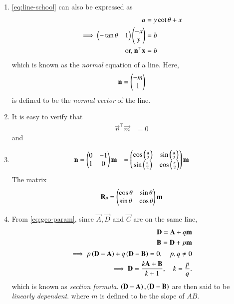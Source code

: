 \begin{enumerate}[label=\thesection.\arabic*.,ref=\thesection.\theenumi]
\item 			\eqref{eq:line-school} can also be expressed as
\begin{align}
	a &= y \cot \theta + x
	\\
\implies 	\begin{pmatrix}-\tan \theta & 1\end{pmatrix}\begin{pmatrix}-x \\ y\end{pmatrix} &= b
	\\
	 \text{or, }\mathbf{n}^{\top}\mathbf{x} &= b
\label{eq:geo-normal}
\end{align}
		which is known as the {\em normal} equation of a line.
		Here, 
\begin{align}
	\mathbf{n} = \begin{pmatrix}-m \\ 1\end{pmatrix} 
\end{align}
		is defined to be the {\em normal vector} of the line.
\item It is easy to verify that
%
\begin{align}
\label{eq:dir_normal_orth}
\vec{n}^{\top}\vec{m} &= 0
\end{align}
%
and
\item 
%
\begin{align}
\mathbf{n} &= \begin{pmatrix}0 & -1 \\ 1 & 0\end{pmatrix}\mathbf{m}
	&= \begin{pmatrix}\cos\left(\frac{\pi}{2}\right) & \sin\left(\frac{\pi}{2}\right) \\  \sin\left(\frac{\pi}{2}\right)& \cos\left(\frac{\pi}{2}\right)\end{pmatrix}\mathbf{m}
\end{align}
The matrix 
%
\begin{align}
	\mathbf{R}_{\theta} 
	= \begin{pmatrix}\cos	\theta & \sin	\theta \\  \sin	\theta& \cos	\theta\end{pmatrix}\mathbf{m}
\label{eq:rot}
\end{align}
  \item From \eqref{eq:geo-param}, 
	  since $\vec{A},\vec{D}$ and $\vec{C}$ are on the same line,
\begin{align}
\begin{split}
			\mathbf{D}=\mathbf{A}+q\mathbf{m} 
			\\ 
			\mathbf{B}=\mathbf{D}+p\mathbf{m} 
\end{split}
	\\
			\label{eq:collinear} 
			\implies 	p\left(\mathbf{D}-\mathbf{A}\right) 
			+ q\left(\mathbf{D}-\mathbf{B}\right) = 0, \quad p, q \ne 0 \\ 
			\implies \mathbf{D} = \frac{k\mathbf{A}+\mathbf{B}}{k+1}, \quad k = \frac{p}{q}.
	  \label{eq:section_formula}
			\end{align} 
	which is known as {\em section formula}. $\left(\mathbf{D}-\mathbf{A}\right), \left(\mathbf{D}-\mathbf{B}\right)$ 
		are then said to be {\em linearly dependent}.
where $m$ is defined to be the slope of $AB$.

\end{enumerate}
